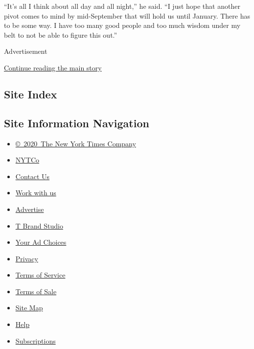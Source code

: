 ``It's all I think about all day and all night,'' he said. ``I just hope
that another pivot comes to mind by mid-September that will hold us
until January. There has to be some way. I have too many good people and
too much wisdom under my belt to not be able to figure this out.''

Advertisement

\protect\hyperlink{after-bottom}{Continue reading the main story}

\hypertarget{site-index}{%
\subsection{Site Index}\label{site-index}}

\hypertarget{site-information-navigation}{%
\subsection{Site Information
Navigation}\label{site-information-navigation}}

\begin{itemize}
\tightlist
\item
  \href{https://help.nytimes3xbfgragh.onion/hc/en-us/articles/115014792127-Copyright-notice}{©~2020~The
  New York Times Company}
\end{itemize}

\begin{itemize}
\tightlist
\item
  \href{https://www.nytco.com/}{NYTCo}
\item
  \href{https://help.nytimes3xbfgragh.onion/hc/en-us/articles/115015385887-Contact-Us}{Contact
  Us}
\item
  \href{https://www.nytco.com/careers/}{Work with us}
\item
  \href{https://nytmediakit.com/}{Advertise}
\item
  \href{http://www.tbrandstudio.com/}{T Brand Studio}
\item
  \href{https://www.nytimes3xbfgragh.onion/privacy/cookie-policy\#how-do-i-manage-trackers}{Your
  Ad Choices}
\item
  \href{https://www.nytimes3xbfgragh.onion/privacy}{Privacy}
\item
  \href{https://help.nytimes3xbfgragh.onion/hc/en-us/articles/115014893428-Terms-of-service}{Terms
  of Service}
\item
  \href{https://help.nytimes3xbfgragh.onion/hc/en-us/articles/115014893968-Terms-of-sale}{Terms
  of Sale}
\item
  \href{https://spiderbites.nytimes3xbfgragh.onion}{Site Map}
\item
  \href{https://help.nytimes3xbfgragh.onion/hc/en-us}{Help}
\item
  \href{https://www.nytimes3xbfgragh.onion/subscription?campaignId=37WXW}{Subscriptions}
\end{itemize}
